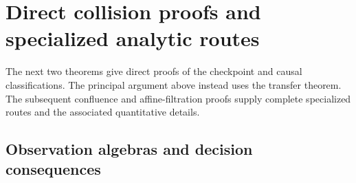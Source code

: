 \documentclass[11pt]{amsart}
\theoremstyle{definition}\newtheorem{definition}[theorem]{Definition}
\theoremstyle{remark}\newtheorem{remark}[theorem]{Remark}
\begin{document}
\section{Direct collision proofs and specialized analytic routes}
\label{app:complete-routes}
The next two theorems give direct proofs of the checkpoint and causal
classifications. The principal argument above instead uses the transfer
theorem. The subsequent confluence and affine-filtration proofs supply
complete specialized routes and the associated quantitative details.


\begingroup
\let\section\subsection
\let\subsection\subsubsection
\let\subsubsection\paragraph



\endgroup
\section{Observation algebras and decision consequences}
\label{app:decisions}
\begingroup
\let\section\subsection
\let\subsection\subsubsection
\let\subsubsection\paragraph




\endgroup
\end{document}
